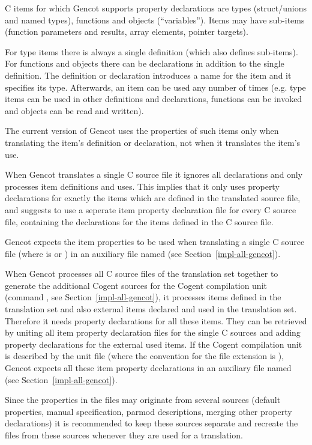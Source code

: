 C items for which Gencot supports property declarations are types (struct/unions and named types), functions and objects (``variables'').
Items may have sub-items (function parameters and results, array elements, pointer targets). 

For type items there is always a single definition (which also defines sub-items). For functions and objects there 
can be declarations
in addition to the single definition. The definition or declaration introduces a name for the item and it specifies its type.
Afterwards, an item can be used any number of times (e.g. type items can be used in other definitions and declarations, functions
can be invoked and objects can be read and written).

The current version of Gencot uses the properties of such items only when translating the item's definition or declaration, not when 
it translates the item's use. 

When Gencot translates a single C source file it ignores all declarations and only processes item definitions and uses. This implies
that it only uses property declarations for exactly the items which are defined in the translated source file, and suggests to
use a seperate item property declaration file for every C source file, containing the declarations for the items defined in the 
C source file.

Gencot expects the item properties to be used when translating a single C source file  (where  
is  or ) in an auxiliary file named  (see Section~\ref{impl-all-gencot}).

When Gencot processes all C source files of the translation set together to generate the additional Cogent sources for the
Cogent compilation unit (command , see Section~\ref{impl-all-gencot}), it processes items defined in the
translation set and also external items declared and used in the translation set. Therefore it needs property declarations 
for all these items. They can be retrieved by uniting all item property declaration files for the single C sources and adding
property declarations for the external used items. If the Cogent compilation unit is described by the unit file  
(where the convention for the file extension  is ), Gencot expects all these item property declarations
in an auxiliary file named  (see Section~\ref{impl-all-gencot}).

Since the properties in the  files may originate from several sources (default properties, manual specification, 
parmod descriptions, merging other property declarations) it is recommended to keep these sources separate and recreate
the  files from these sources whenever they are used for a translation. 

